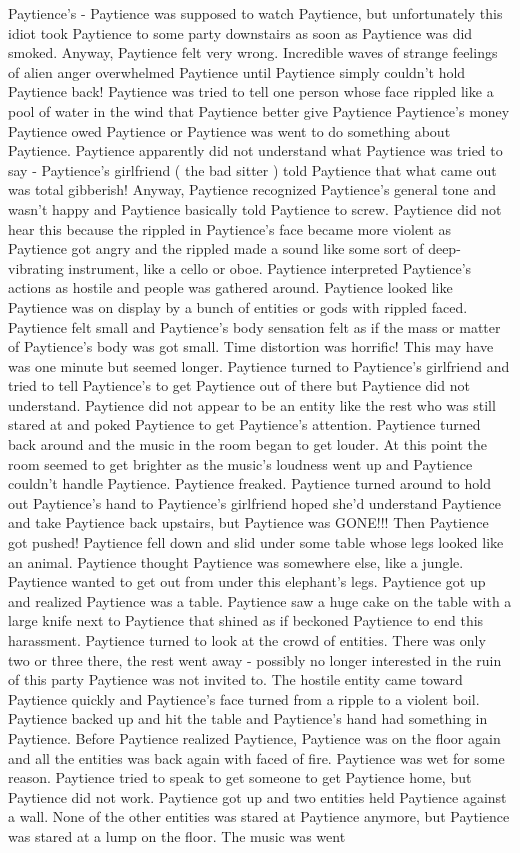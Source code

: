 \documentclass[12pt]{book}
\begin{document}
Paytience's - Paytience was supposed to watch Paytience, but unfortunately this idiot took Paytience to some party downstairs as soon as Paytience was did smoked. Anyway, Paytience felt very wrong. Incredible waves of strange feelings of alien anger overwhelmed Paytience until Paytience simply couldn't hold Paytience back! Paytience was tried to tell one person whose face rippled like a pool of water in the wind that Paytience better give Paytience Paytience's money Paytience owed Paytience or Paytience was went to do something about Paytience. Paytience apparently did not understand what Paytience was tried to say - Paytience's girlfriend ( the bad sitter ) told Paytience that what came out was total gibberish! Anyway, Paytience recognized Paytience's general tone and wasn't happy and Paytience basically told Paytience to screw. Paytience did not hear this because the rippled in Paytience's face became more violent as Paytience got angry and the rippled made a sound like some sort of deep-vibrating instrument, like a cello or oboe. Paytience interpreted Paytience's actions as hostile and people was gathered around. Paytience looked like Paytience was on display by a bunch of entities or gods with rippled faced. Paytience felt small and Paytience's body sensation felt as if the mass or matter of Paytience's body was got small. Time distortion was horrific! This may have was one minute but seemed longer. Paytience turned to Paytience's girlfriend and tried to tell Paytience's to get Paytience out of there but Paytience did not understand. Paytience did not appear to be an entity like the rest who was still stared at and poked Paytience to get Paytience's attention. Paytience turned back around and the music in the room began to get louder. At this point the room seemed to get brighter as the music's loudness went up and Paytience couldn't handle Paytience. Paytience freaked. Paytience turned around to hold out Paytience's hand to Paytience's girlfriend hoped she'd understand Paytience and take Paytience back upstairs, but Paytience was GONE!!! Then Paytience got pushed! Paytience fell down and slid under some table whose legs looked like an animal. Paytience thought Paytience was somewhere else, like a jungle. Paytience wanted to get out from under this elephant's legs. Paytience got up and realized Paytience was a table. Paytience saw a huge cake on the table with a large knife next to Paytience that shined as if beckoned Paytience to end this harassment. Paytience turned to look at the crowd of entities. There was only two or three there, the rest went away - possibly no longer interested in the ruin of this party Paytience was not invited to. The hostile entity came toward Paytience quickly and Paytience's face turned from a ripple to a violent boil. Paytience backed up and hit the table and Paytience's hand had something in Paytience. Before Paytience realized Paytience, Paytience was on the floor again and all the entities was back again with faced of fire. Paytience was wet for some reason. Paytience tried to speak to get someone to get Paytience home, but Paytience did not work. Paytience got up and two entities held Paytience against a wall. None of the other entities was stared at Paytience anymore, but Paytience was stared at a lump on the floor. The music was went 
\end{document}
